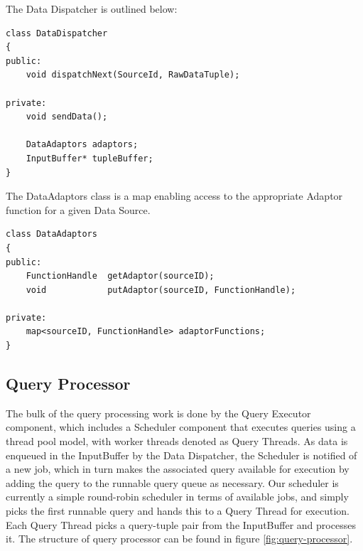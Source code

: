 \documentclass[14pt]{article}
\begin{document}
\noindent The Data Dispatcher is outlined below:

\begin{Verbatim}
class DataDispatcher
{
public:
    void dispatchNext(SourceId, RawDataTuple);

private:
    void sendData();

    DataAdaptors adaptors;
    InputBuffer* tupleBuffer;
}
\end{Verbatim}

\noindent The DataAdaptors class is a map enabling access to the appropriate
Adaptor function for a given Data Source.

\begin{Verbatim}
class DataAdaptors
{
public:
    FunctionHandle  getAdaptor(sourceID);
    void            putAdaptor(sourceID, FunctionHandle);

private:
    map<sourceID, FunctionHandle> adaptorFunctions;
}
\end{Verbatim}

\subsection{Query Processor}

The bulk of the query processing work is done by the Query Executor component,
which includes a Scheduler component that executes queries using a thread pool
model, with worker threads denoted as Query Threads. As data is enqueued in the
InputBuffer by the Data Dispatcher, the Scheduler is notified of a new job,
which in turn makes the associated query available for execution by adding the
query to the runnable query queue as necessary. Our scheduler is currently a
simple round-robin scheduler in terms of available jobs, and simply picks the
first runnable query and hands this to a Query Thread for execution. Each Query
Thread picks a query-tuple pair from the InputBuffer and processes it. The
structure of query processor can be found in figure \ref{fig:query-processor}.
\end{document}
